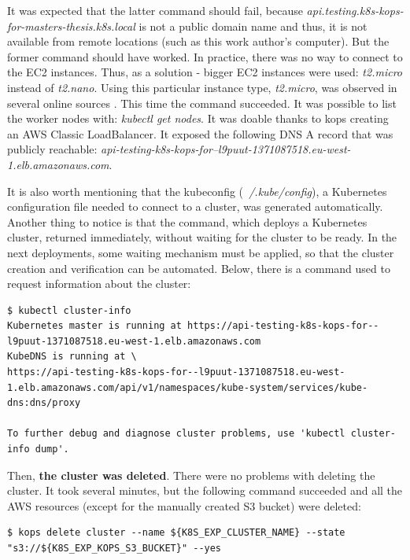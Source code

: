 It was expected that the latter command should fail, because \textit{api.testing.k8s-kops-for-masters-thesis.k8s.local} is not a public domain name and thus, it is not available from remote locations (such as this work author's computer). But the former command should have worked. In practice, there was no way to connect to the EC2 instances. Thus, as a solution - bigger EC2 instances were used: \textit{t2.micro} instead of \textit{t2.nano}. Using this particular instance type, \textit{t2.micro}, was observed in several online sources \cite{online-ha-k8s-blog} \cite{online-perfect-k8s-blog} \cite{online-kops-sa}. This time the command succeeded. It was possible to list the worker nodes with: \textit{kubectl get nodes}. It was doable thanks to kops creating an AWS Classic LoadBalancer. It exposed the following DNS A record that was publicly reachable: \textit{api-testing-k8s-kops-for--l9puut-1371087518.eu-west-1.elb.amazonaws.com}.

It is also worth mentioning that the kubeconfig (\textit{~/.kube/config}), a Kubernetes configuration file needed to connect to a cluster, was generated automatically. Another thing to notice is that the command, which deploys a Kubernetes cluster, returned immediately, without waiting for the cluster to be ready. In the next deployments, some waiting mechanism must be applied, so that the cluster creation and verification can be automated. Below, there is a command used to request information about the cluster:
\begin{lstlisting}[basicstyle=\tiny,caption={Command used to request information about a running Kubernetes cluster}]
$ kubectl cluster-info
Kubernetes master is running at https://api-testing-k8s-kops-for--l9puut-1371087518.eu-west-1.elb.amazonaws.com
KubeDNS is running at \
https://api-testing-k8s-kops-for--l9puut-1371087518.eu-west-1.elb.amazonaws.com/api/v1/namespaces/kube-system/services/kube-dns:dns/proxy

To further debug and diagnose cluster problems, use 'kubectl cluster-info dump'.
\end{lstlisting}

Then, \textbf{the cluster was deleted}. There were no problems with deleting the cluster. It took several minutes, but the following command succeeded and all the AWS resources (except for the manually created S3 bucket) were deleted:

\begin{lstlisting}[basicstyle=\tiny,caption={Command used to delete a Kubernetes cluster created with Kops}]
$ kops delete cluster --name ${K8S_EXP_CLUSTER_NAME} --state "s3://${K8S_EXP_KOPS_S3_BUCKET}" --yes
\end{lstlisting}

